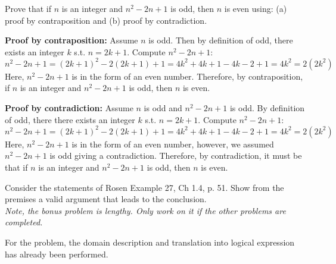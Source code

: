 \begin{questions}
  Prove that if $n$ is an integer and $n^2 - 2n + 1$ is odd,
then $n$ is even using: (a) proof by contraposition and (b) proof by
contradiction.
    \ifprintanswers
        \vspace{-10pt}
    \fi
\begin{solution} \textbf{Proof by contraposition:}
    Assume $n$ is odd.  Then by definition of odd, there exists an
    integer $k$ s.t. $n=2k+1$.  Compute $n^2 - 2n + 1$:
    \[ n^2 - 2n + 1 = (2k+1)^2 - 2(2k+1) + 1 = 4k^2 + 4k + 1 - 4k - 2 + 1 = 4k^2 = 2(2k^2) \]
    Here, $n^2 - 2n + 1$ is in the form of an even number.  Therefore, by
    contraposition, if $n$ is an integer and $n^2 - 2n + 1$ is odd,
    then $n$ is even.

    \medskip
    \textbf{Proof by contradiction:} Assume $n$ is odd and $n^2 - 2n + 1$ is
    odd.  By definition of odd, there there exists an
    integer $k$ s.t. $n=2k+1$.  Compute $n^2 - 2n + 1$:
    \[ n^2 - 2n + 1 = (2k+1)^2 - 2(2k+ 1) + 1 = 4k^2 + 4k+ 1 - 4k - 2 + 1 = 4k^2 = 2(2k^2) \]
    Here, $n^2 - 2n + 1$ is in the form of an even number, however, we assumed
    $n^2 -2n +1$ is odd giving a contradiction. Therefore, by
    contradiction, it must be that if $n$ is an integer and $n^2 - 2n + 1$ is
    odd, then $n$ is even.
\end{solution}


\bonusquestion[4] Consider the statements of Rosen Example 27, Ch 1.4, p. 51.  Show from the premises a valid argument that leads to the conclusion. \\
\textit{Note, the bonus problem is lengthy.  Only work on it if the other problems are completed.}
 \ifprintanswers
        \vspace{-10pt}
    \fi
\begin{solution}
    For the problem, the domain description and translation into logical expression has already been performed.


\end{solution}
\end{questions}
